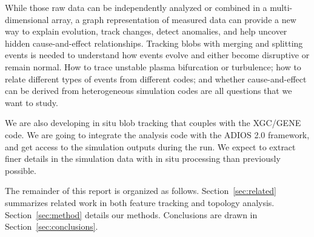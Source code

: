 While those raw data can be independently analyzed or combined in a multi-dimensional array, a graph representation of measured data can provide a new way to explain evolution, track changes, detect anomalies, and help uncover hidden cause-and-effect relationships. Tracking blobs with merging and splitting events is needed to understand how events evolve and either become disruptive or remain normal.  How to trace unstable plasma bifurcation or turbulence; how to relate different types of events from different codes; and whether cause-and-effect can be derived from heterogeneous simulation codes are all questions that we want to study.

We are also developing in situ blob tracking that couples with the XGC/GENE code.  We are going to integrate the analysis code with the ADIOS 2.0 framework, and get access to the simulation outputs during the run.  We expect to extract finer details in the simulation data with in situ processing than previously possible.  

The remainder of this report is organized as follows.  Section~\ref{sec:related} summarizes related work in both feature tracking and topology analysis.  Section~\ref{sec:method} details our methods.  Conclusions are drawn in Section~\ref{sec:conclusions}.  